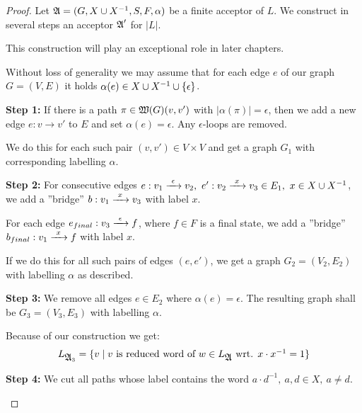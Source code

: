 
\begin{proof}
Let $\mbox{$\mathfrak{A}$} = (G, X \cup {X}^{-1}, S, F, \alpha)$ be a finite acceptor of $L$. We
construct in several steps an acceptor $\mbox{$\mathfrak{A}$}'$ for $|L|$.

This construction will play an exceptional role in later chapters.

Without loss of generality we may assume that for each edge $e$ of our graph $G
= (V, E)$ it holds $\alpha(e) \in X \cup {X}^{-1} \cup \mbox{$\{\epsilon\}$}$.

{\bf Step 1:} If there is a path $\pi \in \mbox{$\mathfrak{W}(G)$}(v, v')$ with
$|\alpha(\pi)| = \epsilon$, then we add a new edge $e: v \to v'$ to $E$ and set
$\alpha(e) = \epsilon$. Any $\epsilon$-loops are removed.

\begin{center}

\end{center}

We do this for each such pair $(v, v')\in V \times V$ and get a graph $G_1$ with
corresponding labelling $\alpha$.

{\bf Step 2:} For consecutive edges $e: v_1 \xrightarrow{\ {\epsilon}\ } v_2,\ e': v_2
\xrightarrow{\ {x}\ } v_3 \in E_1,\ x \in X \cup {X}^{-1}$, we add a ''bridge'' $b: v_1 \xrightarrow{\ {x}\ }
v_3$ with label $x$.

For each edge $e_{final}: v_3 \xrightarrow{\ {\epsilon}\ } f$, where $f \in F$ is a final
state, we add a ''bridge'' $b_{final}: v_1 \xrightarrow{\ {x}\ } f$ with label $x$.

\begin{center}

\end{center}

If we do this for all such pairs of edges $(e, e')$, we get a graph
$G_2=(V_2,E_2)$ with labelling $\alpha$ as described.

{\bf Step 3:} We remove all edges $e \in E_2$ where $\alpha(e) = \epsilon$. The
resulting graph shall be $G_3=(V_3,E_3)$ with labelling $\alpha$.

Because of our construction we get:
\[ L_{\mbox{$\mathfrak{A}$}_3} = \mbox{$\{v \mid v \mbox{ is reduced word of } w \in
L_{\mbox{$\mathfrak{A}$}} \mbox{ wrt. } x \cdot x^{-1} = 1\}$} \]

{\bf Step 4:} We cut all paths whose label contains the word $a \cdot
d^{-1},\ a, d \in X,\ a \neq d$.

\begin{center}

\end{center}


\end{proof}
